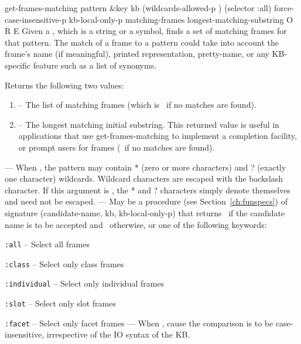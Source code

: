 \begin{okbcop}{get-frames-matching}{ pattern \&key kb (wildcards-allowed-p \true) (selector :all) force-case-insensitive-p kb-local-only-p} { matching-frames longest-matching-substring } { O } { R } { E }
Given a , which is a string or a symbol,
  finds a set of matching frames for that pattern.
  The match of a frame to a pattern could take into account the frame's name
  (if meaningful), printed representation, pretty-name, or any KB-specific
  feature such as a list of synonyms.

  Returns the following two values:
  \begin{enumerate}
  \item {} -- The list of matching frames (which is
         \emptylist\ if no matches are found).
  \item {} -- The longest matching initial
         substring.  This returned value is useful in applications that use
         get-frames-matching to implement a completion facility, or prompt
         users for frames (\false\ if no matches are found).
  \end{enumerate}
     --- When \true, the pattern may contain * (zero or more characters)
         and ? (exactly one character) wildcards.  Wildcard characters are
         escaped with the backslash character.  If this argument is \false,
         the * and ? characters simply denote themselves and need not be
         escaped.
     --- May be a procedure (see Section~\ref{ch:funspecs}) of
         signature
         (candidate-name, kb, kb-local-only-p)
         that returns \true\ if the candidate name is to be
         accepted and \false\ otherwise, or one of the following keywords:
         \bitem
           \item {\tt :all} -- Select all frames
           \item {\tt :class} -- Select only class frames
           \item {\tt :individual} -- Select only individual frames
           \item {\tt :slot} -- Select only slot frames
           \item {\tt :facet} -- Select only facet frames
         \eitem
     --- When \true, cause the comparison is to be case-insensitive, 
         irrespective of the IO syntax of the KB.
\end{okbcop}

